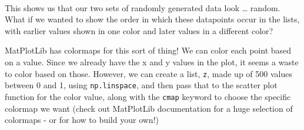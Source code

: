    \begin{center}
    \end{center}
    { \hspace*{\fill} \\}
    
    This shows us that our two sets of randomly generated data look \ldots{}
random. What if we wanted to show the order in which these datapoints
occur in the lists, with earlier values shown in one color and later
values in a different color?

MatPlotLib has colormaps for this sort of thing! We can color each point
based on a value. Since we already have the x and y values in the plot,
it seems a waste to color based on those. However, we can create a list,
\texttt{z}, made up of 500 values between 0 and 1, using
\texttt{np.linspace}, and then pass that to the scatter plot function
for the color value, along with the \texttt{cmap} keyword to choose the
specific colormap we want (check out MatPlotLib documentation for a huge
selection of colormaps - or for how to build your own!)

